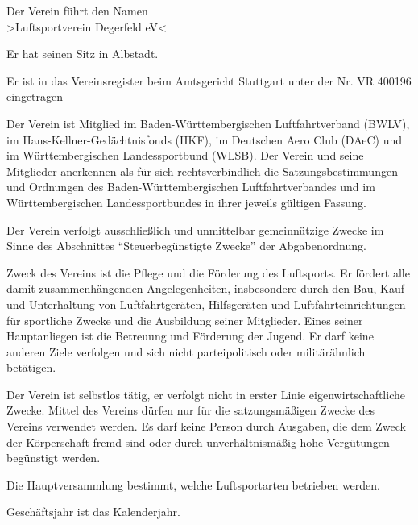 \documentclass[10pt,a4paper,parskip=half]{scrartcl}
\begin{document}
\begin{contract}
  \begin{multicols}{2}
    
    Der Verein führt den Namen\\
    >Luftsportverein Degerfeld eV<
    
    Er hat seinen Sitz in Albstadt.
    
    Er ist in das Vereinsregister beim Amtsgericht Stuttgart unter der Nr. VR 400196 eingetragen
    
    Der Verein ist Mitglied im Ba\-den-Würt\-tem\-ber\-gischen Luftfahrt\-verband (BWLV),
    im Hans-Kellner-Gedächtnis\-fonds (HKF),
    im Deutschen Aero Club (DAeC) und im Würt\-tem\-ber\-gischen Landessportbund (WLSB).
    Der Verein und seine Mitglieder anerkennen als für sich rechtsverbindlich die Satzungsbestimmungen und Ordnungen des Baden-Württembergischen Luftfahrt\-verbandes und im Würt\-tem\-ber\-gischen Landes\-sport\-bundes in ihrer jeweils gültigen Fassung.
    
    Der Verein verfolgt ausschließlich und unmittelbar gemeinnützige Zwecke im Sinne des Abschnittes "`Steuerbegünstigte Zwecke"' der Abgabenordnung.
    
    Zweck des Vereins ist die Pflege und die Förderung des Luftsports.
    Er fördert alle damit zusammenhängenden Angelegenheiten,
    insbesondere durch den Bau,
    Kauf und Unterhaltung von Luftfahrtgeräten,
    Hilfsgeräten und Luftfahrteinrichtungen für sportliche Zwecke und die Ausbildung seiner Mitglieder.
    Eines seiner Hauptanliegen ist die Betreuung und Förderung der Jugend.
    Er darf keine anderen Ziele verfolgen und sich nicht parteipolitisch oder militärähnlich betätigen.
    
    Der Verein ist selbstlos tätig,
    er verfolgt nicht in erster Linie eigenwirtschaftliche Zwecke.
    Mittel des Vereins dürfen nur für die satzungsmäßigen Zwecke des Vereins verwendet werden. Es darf keine Person durch Ausgaben,
    die dem Zweck der Körperschaft fremd sind oder durch unverhältnismäßig hohe Vergütungen begünstigt werden.
    
    Die Hauptversammlung bestimmt,
    welche Luftsportarten betrieben werden.
    
    Geschäftsjahr ist das Kalenderjahr.
    

\end{multicols}
\end{contract}
\end{document}
